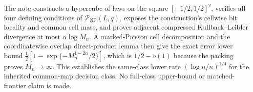 The note constructs a hypercube of laws on the square \([-1/2,1/2]^2\), verifies all four defining conditions of \(\mathcal P_{\mathrm{NP}}(L,q)\), exposes the construction's cellwise bit locality and common cell mass, and proves adjacent compressed Kullback--Leibler divergence at most \(\alpha\log M_n\).  A marked-Poisson cell decomposition and the coordinatewise overlap direct-product lemma then give the exact error lower bound \(\frac12[1-\exp\{-M_n^{1-2\alpha}/2\}]\), which is \(1/2-o(1)\) because the packing proves \(M_n\to\infty\).  This establishes the same-class lower rate \((\log n/n)^{1/4}\) for the inherited common-map decision class.  No full-class upper-bound or matched-frontier claim is made.